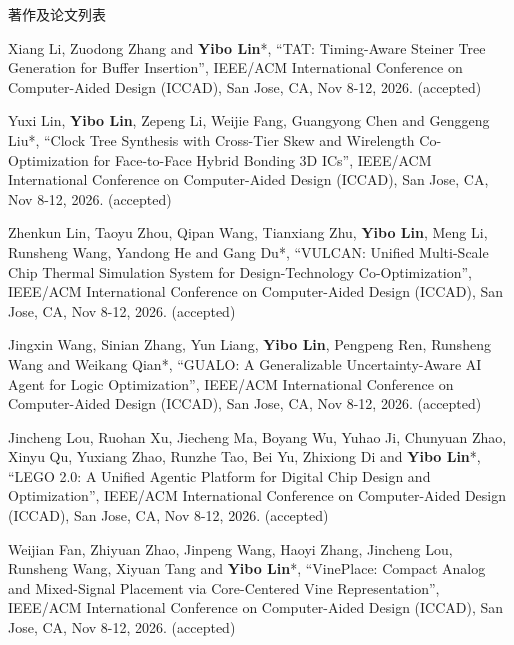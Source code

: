 \begin{rSection}{著作及论文列表}
\begin{description}[font=\normalfont, rightmargin=2em]
\item[{[C244]}]{
        Xiang Li, Zuodong Zhang and \textbf{Yibo Lin}*, 
    ``TAT: Timing-Aware Steiner Tree Generation for Buffer Insertion'', 
    IEEE/ACM International Conference on Computer-Aided Design (ICCAD), San Jose, CA, Nov 8-12, 2026.
    (accepted)
}
            

\item[{[C243]}]{
        Yuxi Lin, \textbf{Yibo Lin}, Zepeng Li, Weijie Fang, Guangyong Chen and Genggeng Liu*, 
    ``Clock Tree Synthesis with Cross-Tier Skew and Wirelength Co-Optimization for Face-to-Face Hybrid Bonding 3D ICs'', 
    IEEE/ACM International Conference on Computer-Aided Design (ICCAD), San Jose, CA, Nov 8-12, 2026.
    (accepted)
}
            

\item[{[C242]}]{
        Zhenkun Lin, Taoyu Zhou, Qipan Wang, Tianxiang Zhu, \textbf{Yibo Lin}, Meng Li, Runsheng Wang, Yandong He and Gang Du*, 
    ``VULCAN: Unified Multi-Scale Chip Thermal Simulation System for Design-Technology Co-Optimization'', 
    IEEE/ACM International Conference on Computer-Aided Design (ICCAD), San Jose, CA, Nov 8-12, 2026.
    (accepted)
}
            

\item[{[C241]}]{
        Jingxin Wang, Sinian Zhang, Yun Liang, \textbf{Yibo Lin}, Pengpeng Ren, Runsheng Wang and Weikang Qian*, 
    ``GUALO: A Generalizable Uncertainty-Aware AI Agent for Logic Optimization'', 
    IEEE/ACM International Conference on Computer-Aided Design (ICCAD), San Jose, CA, Nov 8-12, 2026.
    (accepted)
}
            

\item[{[C240]}]{
        Jincheng Lou, Ruohan Xu, Jiecheng Ma, Boyang Wu, Yuhao Ji, Chunyuan Zhao, Xinyu Qu, Yuxiang Zhao, Runzhe Tao, Bei Yu, Zhixiong Di and \textbf{Yibo Lin}*, 
    ``LEGO 2.0: A Unified Agentic Platform for Digital Chip Design and Optimization'', 
    IEEE/ACM International Conference on Computer-Aided Design (ICCAD), San Jose, CA, Nov 8-12, 2026.
    (accepted)
}
            

\item[{[C239]}]{
        Weijian Fan, Zhiyuan Zhao, Jinpeng Wang, Haoyi Zhang, Jincheng Lou, Runsheng Wang, Xiyuan Tang and \textbf{Yibo Lin}*, 
    ``VinePlace: Compact Analog and Mixed-Signal Placement via Core-Centered Vine Representation'', 
    IEEE/ACM International Conference on Computer-Aided Design (ICCAD), San Jose, CA, Nov 8-12, 2026.
    (accepted)
}
            


\end{description}
\end{rSection}
